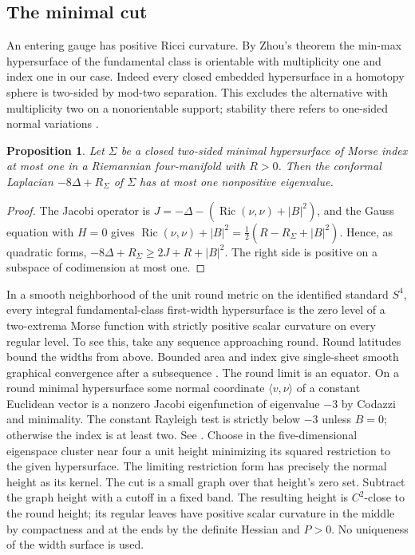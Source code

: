 \documentclass[11pt,letterpaper]{article}
\numberwithin{equation}{section}
\newtheorem{proposition}[theorem]{Proposition}
\theoremstyle{definition}
\DeclareMathOperator{\Ric}{Ric}
\begin{document}
\subsection{The minimal cut}
An entering gauge has positive Ricci curvature. By Zhou's theorem
\cite{Zhou2015MinMax} the min-max hypersurface of the fundamental class is
orientable with multiplicity one and index one in our case.
Indeed every closed embedded hypersurface in a homotopy sphere is
two-sided by mod-two separation. This excludes the alternative with
multiplicity two on a nonorientable support; stability there refers to
one-sided normal variations \cite[Theorem 1.1]{Zhou2017MinMax}.

\begin{proposition}\label{prop:index-one}
Let \(\Sigma\) be a closed two-sided minimal hypersurface of Morse index
at most one in a Riemannian four-manifold with \(R>0\). Then the conformal
Laplacian \(-8\Delta+R_\Sigma\) of \(\Sigma\) has at most one nonpositive
eigenvalue.
\end{proposition}
\begin{proof}
The Jacobi operator is \(J=-\Delta-(\Ric(\nu,\nu)+|B|^2)\), and the Gauss
equation with \(H=0\) gives \(\Ric(\nu,\nu)+|B|^2=\tfrac12(R-R_\Sigma+|B|^2)\).
Hence, as quadratic forms,
\(-8\Delta+R_\Sigma\ge2J+R+|B|^2\). The right side is positive on a
subspace of codimension at most one.
\end{proof}

In a smooth neighborhood of the unit round metric on the identified
standard \(S^4\), every integral fundamental-class first-width
hypersurface is the zero level of a two-extrema Morse function with
strictly positive scalar curvature on every regular level.
To see this, take any sequence approaching round. Round latitudes
bound the widths from above. Bounded area and index give single-sheet
smooth graphical convergence after a subsequence
\cite[Appendix A]{Sharp2017Compactness}. The round limit is an
equator. On a round minimal hypersurface some normal coordinate
\(\langle v,\nu\rangle\) of a constant Euclidean vector is a nonzero
Jacobi eigenfunction of eigenvalue \(-3\) by Codazzi and minimality.
The constant Rayleigh test is strictly below \(-3\) unless \(B=0\);
otherwise the index is at least two. See
\cite[GEO, first-width alignment]{Baker2026MarkedCutCalculations}.
Choose in the five-dimensional eigenspace cluster near four a unit
height minimizing its squared restriction to the given hypersurface.
The limiting restriction form has precisely the normal height as its
kernel. The cut is a small graph over that height's zero set. Subtract
the graph height with a cutoff in a fixed band. The resulting height
is \(C^2\)-close to the round height; its regular leaves have positive
scalar curvature in the middle by compactness and at the ends by the
definite Hessian and \(P>0\). No uniqueness of the width surface is used.
\end{document}
